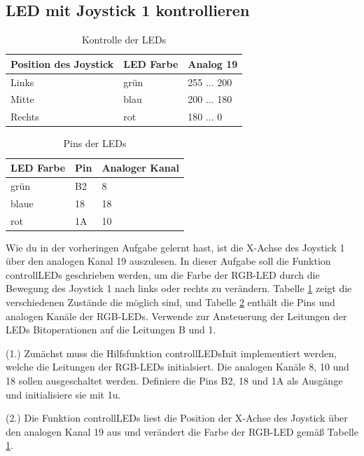 \subsection{LED mit Joystick 1 kontrollieren}
\begin{table}[]
	\centering
	\caption{Kontrolle der LEDs}
	\label{controllLED}
	\begin{tabular}{|l|l|l|}
		\hline
		\textbf{Position des Joystick} & \textbf{LED Farbe} & \textbf{Analog 19} \\ \hline
		Links & grün & 255 ... 200 \\ \hline
		Mitte & blau & 200 ... 180 \\ \hline
		Rechts & rot & 180 ... 0 \\ \hline
	\end{tabular}
\end{table}
\begin{table}[]
	\centering
	\caption{Pins der LEDs}
	\label{LEDInfo}
	\begin{tabular}{|l|l|l|}
		\hline
		\textbf{LED Farbe} & \textbf{Pin} & \textbf{Analoger Kanal} \\ \hline
		grün & B2 & 8 \\ \hline
		blaue & 18 & 18 \\ \hline
		rot & 1A & 10 \\ \hline
	\end{tabular}
\end{table}
Wie du in der vorheringen Aufgabe gelernt hast, ist die X-Achse des Joystick 1 über den analogen Kanal 19 auszulesen. In dieser Aufgabe soll die Funktion controllLEDs geschrieben werden, um die Farbe der RGB-LED durch die Bewegung des Joystick 1 nach links oder rechts zu verändern. Tabelle \ref{controllLED} zeigt die verschiedenen Zustände die möglich sind, und Tabelle \ref{LEDInfo} enthält die Pins und analogen Kanäle der RGB-LEDs. Verwende zur Ansteuerung der Leitungen der LEDs Bitoperationen auf die Leitungen B und 1. 

(1.) Zunächst muss die Hilfsfunktion controllLEDsInit implementiert werden, welche die Leitungen der RGB-LEDs initialsiert. Die analogen Kanäle 8, 10 und 18 sollen ausgeschaltet werden. Definiere die Pins B2, 18 und 1A als Ausgänge und initialisiere sie mit 1u. 

(2.) Die Funktion controllLEDs liest die Position der X-Achse des Joystick über den analogen Kanal 19 aus und verändert die Farbe der RGB-LED gemäß Tabelle \ref{controllLED}. 
